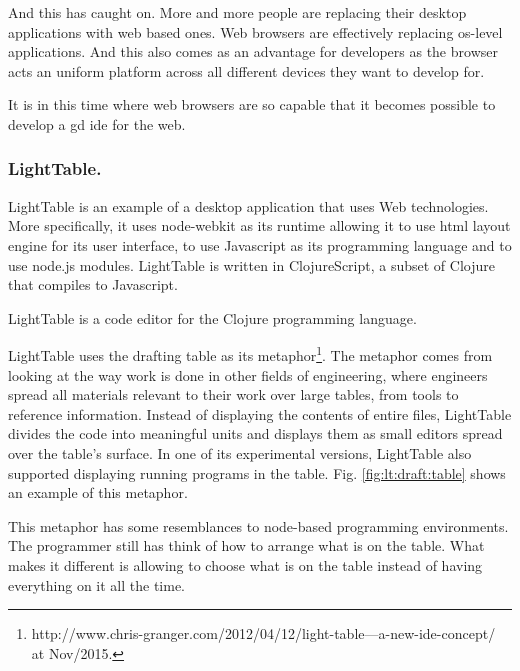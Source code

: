 \documentclass{./llncs2e/llncs}
\begin{document}
	And this has caught on.
	More and more people are replacing their desktop applications with web based ones.
	Web browsers are effectively replacing \ac{os}-level applications.
	And this also comes as an advantage for developers as the browser acts an uniform platform across all different devices they want to develop for.

	It is in this time where web browsers are so capable that it becomes possible to develop a \ac{gd} \ac{ide} for the web.

\subsubsection{LightTable.}
	LightTable\cite{lighttable2015site} is an example of a desktop application that uses Web technologies.
	More specifically, it uses node-webkit as its runtime allowing it to use html layout engine for its user interface, to use Javascript as its programming language and to use node.js\cite{tilkov2010node} modules.
	LightTable is written in ClojureScript\cite{10.1109/MIC.2011.148}, a subset of Clojure that compiles to Javascript.

	LightTable is a code editor for the Clojure programming language\cite{hickey2008clojure}. 


	LightTable uses the drafting table as its metaphor\footnote{http://www.chris-granger.com/2012/04/12/light-table---a-new-ide-concept/ at Nov/2015.}. 
	The metaphor comes from looking at the way work is done in other fields of engineering, where engineers spread all materials relevant to their work over large tables, from tools to reference information. 
	Instead of displaying the contents of entire files, LightTable divides the code into meaningful units and displays them as small editors spread over the table's surface. 
	In one of its experimental versions, LightTable also supported displaying running programs in the table. 
	Fig. \ref{fig:lt:draft:table} shows an example of this metaphor.

	This metaphor has some resemblances to node-based programming environments. 
	The programmer still has think of how to arrange what is on the table.
	What makes it different is allowing to choose what is on the table instead of having everything on it all the time.
\end{document}
